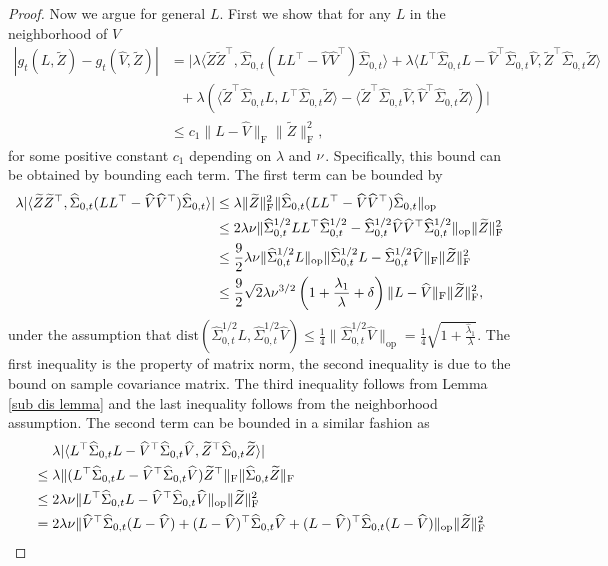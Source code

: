 \documentclass[11pt]{article}
\newcommand{\rev}[1]{\textcolor{black}{#1}}
\newcommand{\hU}{\widehat{V}}
\newcommand{\dist}{\mathrm{dist}}
\newcommand{\sot}{\widehat{\Sigma}_{0,t}}
\newcommand{\0}{{\mathbf{0}}}
\newcommand{\op}{{\mathrm{op}}}
\newcommand{\tZ}{{\widetilde{Z}}}
\begin{document}
\begin{proof}
Now we argue for general $L$. 
First we show that for any $L$ in the neighborhood of $\widehat{V}$ 
\begin{align*}
    |g_t(L,\tZ)-g_t(\hU,\tZ)| 
      & =
      |\lambda\langle \tZ\tZ^\top,\sot (LL^\top  -\hU\hU^\top  )\sot\rangle +\lambda\langle L^\top  \sot L-\hU^\top  \sot\hU,\tZ^\top  \sot \tZ\rangle\\
    &~~~ +\lambda (\langle \tZ^\top \sot L, L^\top\sot \tZ\rangle-\langle \tZ^\top \sot \hU, \hU^\top\sot \tZ\rangle)|\\
    & \leq c_1 \|L-\hU\|_\mathrm{F}\|\tZ\|_\mathrm{F}^2,
\end{align*}
for some positive constant $c_1$ depending on $\lambda$ and $\rev{\nu}$. Specifically, this bound can be obtained by bounding each term. The first term can be bounded by \begin{align*}
    \lambda|\langle \tZ\tZ^\top  ,\sot (LL^\top  -\hU\hU^\top  )\sot\rangle|&\leq \lambda\|\tZ\|_\mathrm{F}^2\|\sot (LL^\top  -\hU\hU^\top  )\sot\|_{\op}\\
    &\leq 2\lambda\rev{\nu}\|\sot^{1/2}LL^\top\sot^{1/2}  -\sot^{1/2}\hU\hU^\top  \sot^{1/2}\|_\op\|\tZ\|_\mathrm{F}^2\\
    &\leq \frac{9}{2}\lambda\rev{\nu}\|\sot^{1/2}L\|_\op\|\sot^{1/2}L-\sot^{1/2}\hU\|_\mathrm{F}\|\tZ\|_\mathrm{F}^2\\
    &\leq \frac{9}{2}\sqrt{2}\lambda\rev{\nu}^{3/2}\left(1+\frac{\lambda_1}{\lambda}+\delta\right)\|L-\hU\|_\mathrm{F}\|\tZ\|_\mathrm{F}^2,
\end{align*}
under the assumption that $\dist(\sot^{1/2}L,\sot^{1/2}\hU)\leq\frac{1}{4}\|\sot^{1/2}\hU\|_\op=\frac{1}{4}\sqrt{1+\frac{\widehat{\lambda}_1}{\lambda}}.$
The first inequality is the property of matrix norm, the second inequality is due to the bound on sample covariance matrix. The third inequality follows from Lemma \ref{sub dis lemma} and the last inequality follows from the neighborhood assumption. 
The second term can be bounded in a similar fashion as
\begin{align*}
&    ~~~~\lambda|\langle L^\top  \sot L-\hU^\top  \sot\hU,\tZ^\top  \sot \tZ\rangle|\\
&\leq \lambda\|(L^\top  \sot L-\hU^\top  \sot\hU)\tZ^\top\|_\mathrm{F}\|  \sot \tZ\|_\mathrm{F}\\
    &\leq 2\lambda\rev{\nu}\|L^\top  \sot L-\hU^\top  \sot\hU\|_\op\|\tZ\|_\mathrm{F}^2\\
    &= 2\lambda\rev{\nu}\|\hU^\top  \sot(L-\hU)+(L-\hU)^\top  \sot \hU+(L-\hU)^\top  \sot(L-\hU)\|_\op\|\tZ\|_\mathrm{F}^2\\

\end{align*}
\end{proof}
\end{document}
